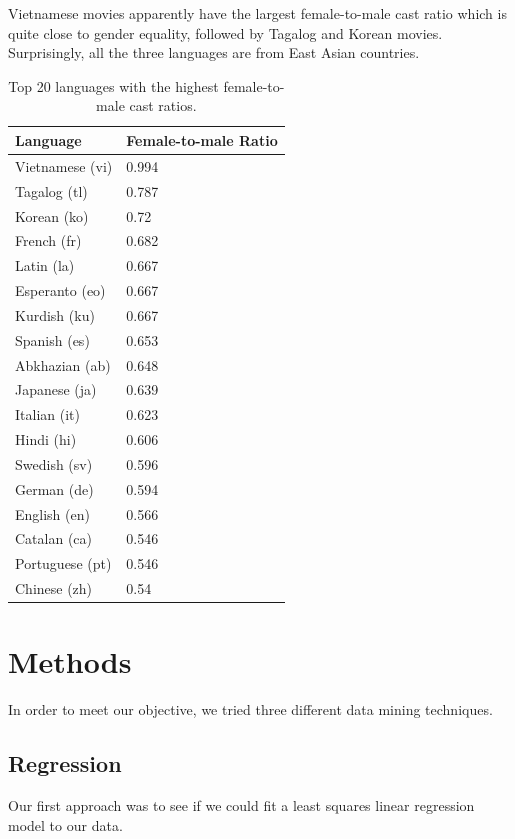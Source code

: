 \documentclass[12pt]{article}
\begin{document}
Vietnamese movies apparently have the largest female-to-male cast ratio which is quite close to gender equality, followed by Tagalog and Korean movies. Surprisingly, all the three languages are from East Asian countries. 

\begin{table}[H]
\begin{center}
\begin{tabu} to 0.6\textwidth { | X[c] | X[c] | }
\hline
\textbf{Language} & \textbf{Female-to-male Ratio} \\ \hline
Vietnamese (vi) & 0.994 \\
Tagalog (tl) & 0.787 \\
Korean (ko) & 0.72 \\
French (fr) & 0.682 \\
Latin (la) & 0.667 \\
Esperanto (eo) & 0.667 \\
Kurdish (ku) & 0.667 \\
Spanish (es) & 0.653 \\
Abkhazian (ab) & 0.648 \\
Japanese (ja) & 0.639 \\
Italian (it) & 0.623 \\
Hindi (hi) & 0.606 \\
Swedish (sv) & 0.596 \\
German (de) & 0.594 \\
English (en) & 0.566 \\
Catalan (ca) & 0.546 \\
Portuguese (pt) & 0.546 \\
Chinese (zh) & 0.54 \\ \hline
\end{tabu}
\end{center}
\caption{Top 20 languages with the highest female-to-male cast ratios.}
\label{lang_female_male_ratio}
\end{table}

\section{Methods}

In order to meet our objective, we tried three different data mining techniques.

\subsection{Regression}
Our first approach was to see if we could fit a least squares linear regression model to our data. \\
\end{document}
